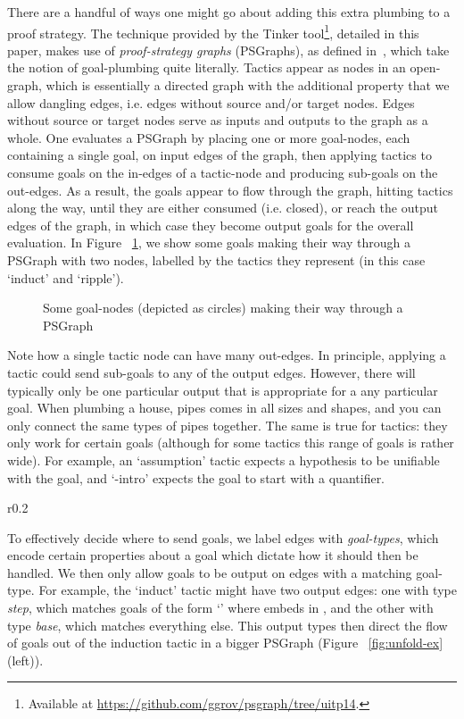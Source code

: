 \documentclass[submission,copyright,creativecommons]{eptcs}
\begin{document}
There are a handful of ways one might go about adding this extra plumbing to a proof strategy. The technique provided by the Tinker tool\footnote{
Available at \url{https://github.com/ggrov/psgraph/tree/uitp14}.}, detailed in this paper, makes use of \textit{proof-strategy graphs} (PSGraphs), as defined in~\cite{LPAR13}, which take the notion of goal-plumbing quite literally. Tactics appear as nodes in an open-graph, which is essentially a directed graph with the additional property that we allow dangling edges, i.e. edges without source and/or target nodes. Edges without source or target nodes serve as inputs and outputs to the graph as a whole. One evaluates a PSGraph by placing one or more goal-nodes, each containing a single goal, on input edges of the graph, then applying tactics to consume goals on the in-edges of a tactic-node and producing sub-goals on the out-edges. As a result, the goals appear to flow through the graph, hitting tactics along the way, until they are either consumed (i.e. closed), or reach the output edges of the graph, in which case they become output goals for the overall evaluation. In Figure ~\ref{fig:ripple-ex}, we show some goals making their way through a PSGraph with two nodes, labelled by the tactics they represent (in this case `induct' and `ripple').
\begin{figure}
  \centering
  \caption{Some goal-nodes (depicted as circles) making their way through a PSGraph}\label{fig:ripple-ex}
\end{figure}

Note how a single tactic node can have many out-edges. In principle, applying a tactic could send sub-goals to any of the output edges. However, there will typically only be one particular output that is appropriate for a any particular goal. When plumbing a house, pipes comes in all sizes and shapes, and you can only connect the same types of pipes together. The same is true for tactics: they only work for certain goals (although for some tactics this range of goals is rather wide). For example, an `assumption' tactic expects a hypothesis to be unifiable with the goal, and `-intro' expects the goal to start with a  quantifier. 

\begin{wrapfigure}[6]{r}{0.2\textwidth}
  \centering
\end{wrapfigure}
To effectively decide where to send goals, we label edges with \textit{goal-types}, which encode certain properties about a goal which dictate how it should then be handled. We then only allow goals to be output on edges with a matching goal-type. For example, the `induct' tactic might have two output edges: one with type \textit{step}, which matches goals of the form `' where  embeds in , and the other with type \textit{base}, which matches everything else. This output types then direct the flow of goals out of the induction tactic in a bigger PSGraph (Figure ~\ref{fig:unfold-ex} (left)).
\end{document}

